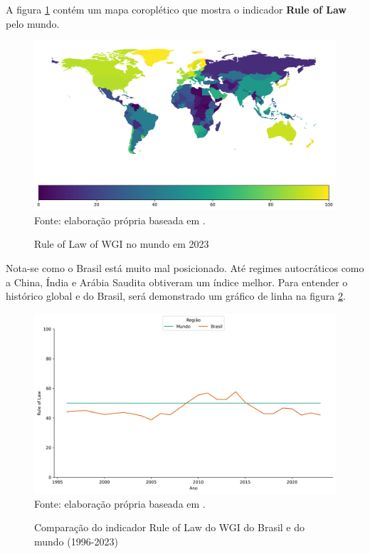 A figura \ref{fig:mapa_coropletico_wgi_rl} contém um mapa coroplético que mostra  o indicador \textbf{Rule of Law} pelo mundo.
 
\begin{figure}[H]
	\centering
	\caption{Rule of Law of WGI no mundo em 2023}
	\includegraphics[width=1\linewidth]{figuras/mapa_coropletico_wgi_rl.png}
	\label{fig:mapa_coropletico_wgi_rl}
	\footnotesize{Fonte: elaboração própria baseada em \cite{wgi_dados}.}
\end{figure}

Nota-se como o Brasil está muito mal posicionado. Até regimes autocráticos como a China, Índia e Arábia Saudita obtiveram um índice melhor. Para entender o histórico global e do Brasil, será demonstrado um gráfico de linha na figura \ref{fig:comparacao_wgi_rl_brasil_mundo}.

\begin{figure}[H]
	\centering
	\caption{Comparação do indicador Rule of Law do WGI do Brasil e do mundo (1996-2023)}
	\includegraphics[width=1\linewidth]{figuras/comparacao_wgi_rl_brasil_mundo}
	\label{fig:comparacao_wgi_rl_brasil_mundo}
	\footnotesize{Fonte: elaboração própria baseada em \cite{wgi_dados}.}
\end{figure}

